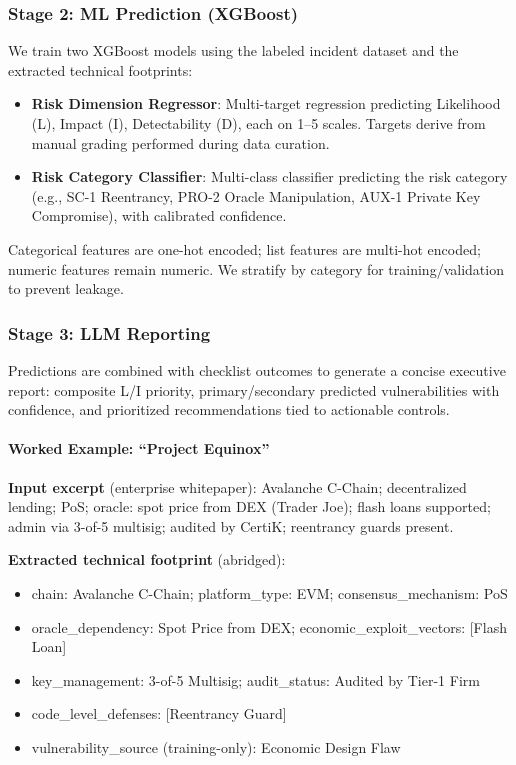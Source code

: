 \subsubsection{Stage 2: ML Prediction (XGBoost)}
We train two XGBoost models using the labeled incident dataset and the extracted technical footprints:
\begin{itemize}
    \item \textbf{Risk Dimension Regressor}: Multi-target regression predicting Likelihood (L), Impact (I), Detectability (D), each on 1--5 scales. Targets derive from manual grading performed during data curation.
    \item \textbf{Risk Category Classifier}: Multi-class classifier predicting the risk category (e.g., SC-1 Reentrancy, PRO-2 Oracle Manipulation, AUX-1 Private Key Compromise), with calibrated confidence.
\end{itemize}
Categorical features are one-hot encoded; list features are multi-hot encoded; numeric features remain numeric. We stratify by category for training/validation to prevent leakage.

\subsubsection{Stage 3: LLM Reporting}
Predictions are combined with checklist outcomes to generate a concise executive report: composite L/I priority, primary/secondary predicted vulnerabilities with confidence, and prioritized recommendations tied to actionable controls.

\paragraph{Worked Example: ``Project Equinox''}
\textbf{Input excerpt} (enterprise whitepaper): Avalanche C-Chain; decentralized lending; PoS; oracle: spot price from DEX (Trader Joe); flash loans supported; admin via 3-of-5 multisig; audited by CertiK; reentrancy guards present.

\textbf{Extracted technical footprint} (abridged):
\begin{itemize}
    \item chain: Avalanche C-Chain; platform\_type: EVM; consensus\_mechanism: PoS
    \item oracle\_dependency: Spot Price from DEX; economic\_exploit\_vectors: [Flash Loan]
    \item key\_management: 3-of-5 Multisig; audit\_status: Audited by Tier-1 Firm
    \item code\_level\_defenses: [Reentrancy Guard]
    \item vulnerability\_source (training-only): Economic Design Flaw
\end{itemize}

